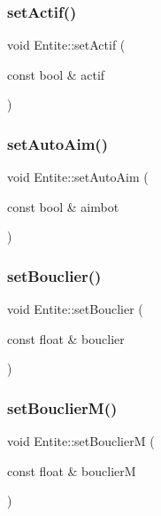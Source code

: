 \subsubsection{\texorpdfstring{set\+Actif()}{setActif()}}
{\footnotesize\ttfamily void Entite\+::set\+Actif (\begin{DoxyParamCaption}\item[{const bool \&}]{actif }\end{DoxyParamCaption})\hspace{0.3cm}{\ttfamily [inline]}}

\mbox{\label{class_entite_a41a766786a95ec14c36483b3c0934e12}} 
\subsubsection{\texorpdfstring{set\+Auto\+Aim()}{setAutoAim()}}
{\footnotesize\ttfamily void Entite\+::set\+Auto\+Aim (\begin{DoxyParamCaption}\item[{const bool \&}]{aimbot }\end{DoxyParamCaption})\hspace{0.3cm}{\ttfamily [inline]}}

\mbox{\label{class_entite_a32e937b33745db139fae2e24b2587890}} 
\subsubsection{\texorpdfstring{set\+Bouclier()}{setBouclier()}}
{\footnotesize\ttfamily void Entite\+::set\+Bouclier (\begin{DoxyParamCaption}\item[{const float \&}]{bouclier }\end{DoxyParamCaption})\hspace{0.3cm}{\ttfamily [inline]}}

\mbox{\label{class_entite_a0d6411b7a94d911d8adb0d4e08c3741c}} 
\subsubsection{\texorpdfstring{set\+Bouclier\+M()}{setBouclierM()}}
{\footnotesize\ttfamily void Entite\+::set\+BouclierM (\begin{DoxyParamCaption}\item[{const float \&}]{bouclierM }\end{DoxyParamCaption})\hspace{0.3cm}{\ttfamily [inline]}}

